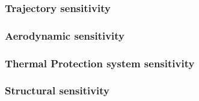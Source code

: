 
\subsubsection{Trajectory sensitivity}\label{subsec:orbitsens}


\subsubsection{Aerodynamic sensitivity}\label{subsec:aerosens}


%

\subsubsection{Thermal Protection system sensitivity}\label{subsec:thermalsens}


\subsubsection{Structural sensitivity}\label{subsec:strucsens}







